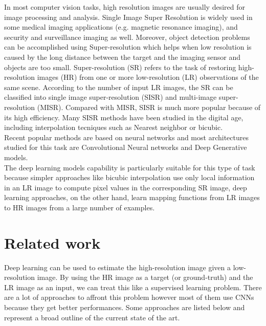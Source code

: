 \documentclass[10pt,twocolumn,letterpaper]{article}
\begin{document}
	In most computer vision tasks, high resolution images are usually desired for image processing and analysis. Single Image Super Resolution is widely used in some medical imaging applications (e.g. magnetic resonance imaging), and security and surveillance imaging as well. Moreover, object detection problems can be accomplished using Super-resolution  which helps when low resolution is caused by the long distance between the target and the imaging sensor and objects are too small.
	Super-resolution (SR) refers to the task of restoring high-resolution images (HR) from one or more low-resolution (LR) observations of the same scene. According to the number of input LR images, the SR can be classified into single image super-resolution (SISR) and multi-image super-resolution (MISR). Compared with MISR, SISR is much more popular because of its high efficiency.
	Many SISR methods have been studied in the digital age, including interpolation tecniques such as Nearest neighbor or bicubic.\\
	Recent popular methods are based on neural networks and most architectures studied for this task are Convolutional Neural networks and Deep Generative models.\\
	The deep learning models capability is particularly suitable for this type of task because simpler approaches like bicubic interpolation use only local information in an LR image to compute pixel values in the corresponding SR image, deep learning approaches, on the other hand, learn mapping functions from LR images to HR images from a large number of examples.\\
	
\section{Related work}
	Deep learning can be used to estimate the high-resolution image given a low-resolution image. By using the HR image as a target (or ground-truth) and the LR image as an input, we can treat this like a supervised learning problem. There are a lot of approaches to affront this problem however most of them use CNNs because they get better performances.  Some approaches are listed below and represent a broad outline of the current state of the art.
\end{document}
